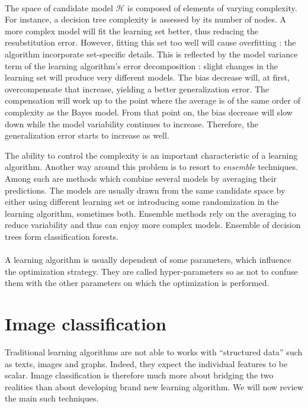 \documentclass[a4paper]{report}
\begin{document}
\paragraph{}
The space of candidate model $\mathcal{H}$ is composed of elements of varying complexity. For instance, a decision tree complexity is assessed by its number of nodes. A more complex model will fit the learning set better, thus reducing the resubstitution error. However, fitting this set too well will cause overfitting : the algorithm incorporate set-specific details. This is reflected by the model variance term of the learning algorithm's error decomposition : slight changes in the learning set will produce very different models. The bias decrease will, at first, overcompensate that increase, yielding a better generalization error. The compensation will work up to the point where the average is of the same order of complexity as the Bayes model. From that point on, the bias decrease will slow down while the model variability continues to increase. Therefore, the generalization error starts to increase as well.
\par
The ability to control the complexity is an important characteristic of a learning algorithm. Another way around this problem is to resort to \textit{ensemble} techniques. Among such are methods which combine several models by averaging their predictions. The models are usually drawn from the same candidate space by either using different learning set or introducing some randomization in the learning algorithm, sometimes both. Ensemble methods rely on the averaging to reduce variability and thus can enjoy more complex models. Ensemble of decision trees form classification forests.
\paragraph{}
A learning algorithm is usually dependent of some parameters, which influence the optimization strategy. They are called hyper-parameters so as not to confuse them with the other parameters on which the optimization is performed.

\section{Image classification}
Traditional learning algorithms are not able to works with ``structured data'' such as texts, images and graphs. Indeed, they expect the individual features to be scalar. Image classification is therefore much more about bridging the two realities than about developing brand new learning algorithm. We will now review the main such techniques.
\end{document}
